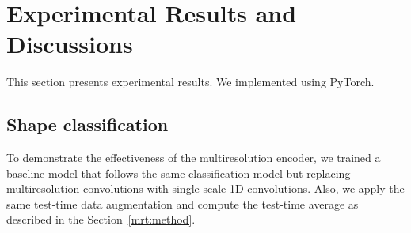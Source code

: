 \section{Experimental Results and Discussions}
This section presents experimental results. We implemented \mrtnet using PyTorch. 

\subsection{Shape classification} To demonstrate the effectiveness of the multiresolution encoder, we trained a baseline model that follows the same classification model but replacing multiresolution convolutions with single-scale 1D convolutions. Also, we apply the same test-time data augmentation and compute the test-time average as described in the Section~\ref{mrt:method}. %

